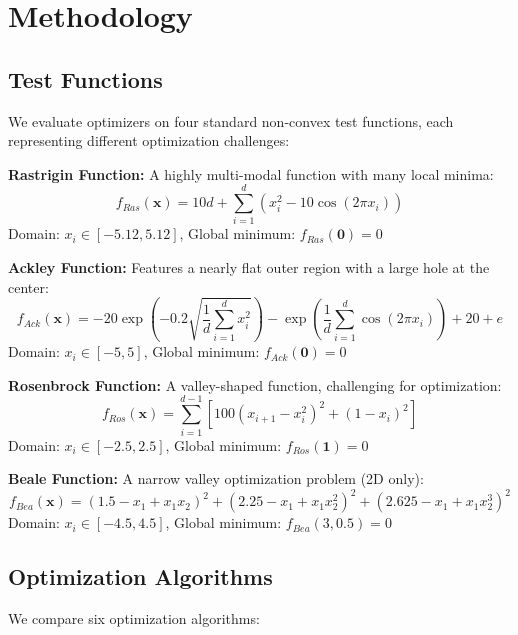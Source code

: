 \documentclass[12pt,a4paper]{article}
\begin{document}
\section{Methodology}
\label{sec:methodology}

\subsection{Test Functions}

We evaluate optimizers on four standard non-convex test functions, each representing different optimization challenges:

\textbf{Rastrigin Function:} A highly multi-modal function with many local minima:
\begin{equation}
f_{Ras}(\mathbf{x}) = 10d + \sum_{i=1}^{d} \left(x_i^2 - 10\cos(2\pi x_i)\right)
\end{equation}
Domain: $x_i \in [-5.12, 5.12]$, Global minimum: $f_{Ras}(\mathbf{0}) = 0$

\textbf{Ackley Function:} Features a nearly flat outer region with a large hole at the center:
\begin{equation}
f_{Ack}(\mathbf{x}) = -20\exp\left(-0.2\sqrt{\frac{1}{d}\sum_{i=1}^{d}x_i^2}\right) - \exp\left(\frac{1}{d}\sum_{i=1}^{d}\cos(2\pi x_i)\right) + 20 + e
\end{equation}
Domain: $x_i \in [-5, 5]$, Global minimum: $f_{Ack}(\mathbf{0}) = 0$

\textbf{Rosenbrock Function:} A valley-shaped function, challenging for optimization:
\begin{equation}
f_{Ros}(\mathbf{x}) = \sum_{i=1}^{d-1}\left[100(x_{i+1} - x_i^2)^2 + (1-x_i)^2\right]
\end{equation}
Domain: $x_i \in [-2.5, 2.5]$, Global minimum: $f_{Ros}(\mathbf{1}) = 0$

\textbf{Beale Function:} A narrow valley optimization problem (2D only):
\begin{equation}
f_{Bea}(\mathbf{x}) = (1.5 - x_1 + x_1x_2)^2 + (2.25 - x_1 + x_1x_2^2)^2 + (2.625 - x_1 + x_1x_2^3)^2
\end{equation}
Domain: $x_i \in [-4.5, 4.5]$, Global minimum: $f_{Bea}(3, 0.5) = 0$

\subsection{Optimization Algorithms}

We compare six optimization algorithms:
\end{document}
